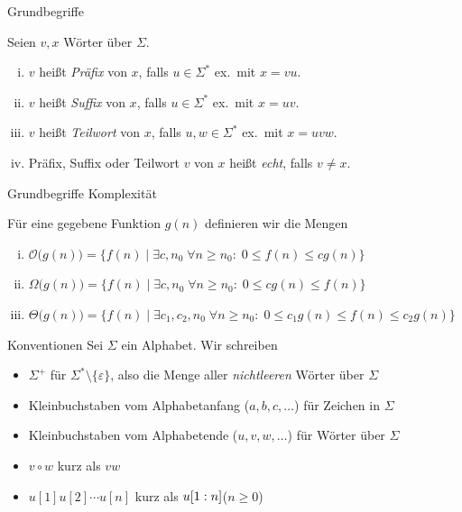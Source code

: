 \documentclass[xcolor=dvipsnames, aspectratio=169]{beamer}
\begin{document}
\begin{frame}[<+->]{Grundbegriffe}
\begin{defi}
Seien $v,x$ Wörter über $\Sigma$.
\begin{enumerate}[(i)]
\item $v$ heißt \textit{Präfix} von $x$, falls $u\in\Sigma^*$ ex.\ mit $x=vu$.
\item $v$ heißt \textit{Suffix} von $x$, falls $u\in\Sigma^*$ ex.\ mit $x=uv$.
\item $v$ heißt \textit{Teilwort} von $x$, falls $u,w\in\Sigma^*$ ex.\ mit $x=uvw$.
\item Präfix, Suffix oder Teilwort $v$ von $x$ heißt \textit{echt}, falls $v\neq x$.
\end{enumerate}
\end{defi}
\end{frame}

\begin{frame}[<+->]{Grundbegriffe Komplexität}
\begin{defi}
Für eine gegebene Funktion $g(n)$ definieren wir die Mengen
\begin{enumerate}[(i)]
\item $\mathcal{O}\big(g(n)\big)=\big\{f(n)\;\big\vert\;\exists c,n_0\;\forall n\geq n_0 :\; 0\leq f(n)\leq cg(n)\big\}$
\item $\Omega\big(g(n)\big)=\big\{f(n)\;\big\vert\;\exists c,n_0\;\forall n\geq n_0 :\; 0\leq cg(n)\leq f(n)\big\}$
\item $\Theta\big(g(n)\big)=\big\{f(n)\;\big\vert\;\exists c_1,c_2,n_0\;\forall n\geq n_0 :\; 0\leq c_1g(n)\leq f(n)\leq c_2g(n)\big\}$
\end{enumerate}
\end{defi}\medskip
{}
\end{frame}

\begin{frame}[<+->]{Konventionen}
Sei $\Sigma$ ein Alphabet. Wir schreiben\bigskip

\begin{itemize}
\item $\Sigma^+$ für $\Sigma^*\setminus \{\varepsilon\}$, also die Menge aller \textit{nichtleeren} Wörter über $\Sigma$
\item Kleinbuchstaben vom Alphabetanfang ($a,b,c,\dots$) für Zeichen in $\Sigma$
\item Kleinbuchstaben vom Alphabetende ($u, v, w,\dots$) für Wörter über $\Sigma$
\item $v\circ w$ kurz als $vw$
\item $u[1] u[2] \cdots u[n]$ kurz als $u[1 : n]$\hfill ($n\geq 0$)

\end{itemize}
\end{frame}
\end{document}
